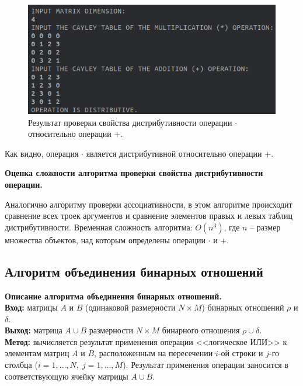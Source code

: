 \documentclass[spec, och, otchet, hidelinks]{SCWorks}
\newcommand{\tbf}[1]{\textbf{#1}}
\begin{document}
\begin{figure}[h]
  \center\includegraphics[scale=0.6]{check_distr.png}
  \caption{Результат проверки свойства дистрибутивности операции $\cdot$
    относительно операции $+$.}
\end{figure}

\par Как видно, операция $\cdot$ является дистрибутивной относительно операции $+$.

\par \tbf{Оценка сложности алгоритма проверки свойства дистрибутивности
  операции.}
\par Аналогично алгоритму проверки ассоциативности, в этом алгоритме происходит
сравнение всех троек аргументов и сравнение элементов правых и левых таблиц
дистрибутивности. Временная сложность алгоритма: $O(n^3)$, где $n$ -- размер
множества объектов, над которым определены операции $\cdot$ и $+$.

\newpage

\subsection{Алгоритм объединения бинарных отношений}
\par \tbf{Описание алгоритма объединения бинарных отношений.} \\
\tbf{Вход:} матрицы $A$ и $B$ (одинаковой размерности $N \times M$) бинарных отношений $\rho$ и $\delta$. \\
\tbf{Выход:} матрица $A \cup B$ размерности $N \times M$ бинарного отношения
$\rho \cup \delta$. \\
\tbf{Метод:} вычисляется результат применения операции <<логическое ИЛИ>> к
элементам матриц $A$ и $B$, расположенным на пересечении $i$-ой строки и $j$-го
столбца ($i = 1,\dots,N, \; j = 1,\dots,M$). Результат применения операции
заносится в соответствующую ячейку матрицы $A \cup B$. \\
\end{document}
